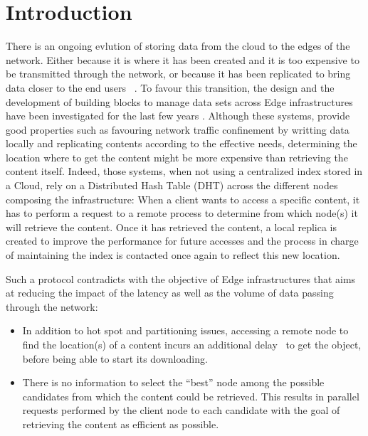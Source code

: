 
\section{Introduction}

There is an ongoing evlution of storing data from the cloud to the
edges of the network. Either because it is where it has been created
and it is too expensive to be transmitted through the network, or
because it has been replicated to bring data closer to the end users
~\cite{shi2016edge, foggy_cache, cachier}.
%
To favour this transition, the design and the development of building
blocks to manage data sets across Edge infrastructures have been
investigated for the last few years \cite{confais2017performance,
  confais2017object, fogstore, hasenburg2020towards}.  Although these
systems, provide good properties such as favouring network traffic
confinement by writting data locally and replicating contents
according to the effective needs, determining the location where to
get the content might be more expensive than retrieving the content
itself.
%
Indeed, those systems, when not using a centralized index stored in a
Cloud, rely on a Distributed Hash Table (DHT) across the different
nodes composing the infrastructure: When a client wants to access a
specific content, it has to perform a request to a remote process to
determine from which node(s) it will retrieve the content.  Once it has
retrieved the content, a local replica
is created to improve the performance for future accesses and the
process in charge of maintaining the index is contacted once again to reflect this
new location.
%


Such a protocol contradicts with the objective of Edge
infrastructures that aims at reducing the impact of the
latency as well as the volume of data passing through the network:
\begin{itemize}
  \item In addition to hot spot and partitioning issues, accessing a
    remote node to find the location(s) of a content incurs an
    additional delay~\cite{asrese2019measuring, doan2019tracing} to
    get the object, before being able to start its downloading.
  \item There is no information to select the ``best'' node among the
     possible candidates from which the content  could be
     retrieved. This results in parallel requests performed by the client node to
     each candidate with the goal of retrieving the content as efficient
     as possible.
\end{itemize}    

